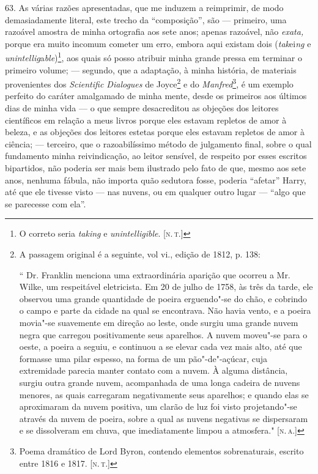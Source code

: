 63. As várias razões apresentadas, que me induzem a reimprimir, de modo
demasiadamente literal, este trecho da ``composição'', são --- primeiro,
uma razoável amostra de minha ortografia aos sete anos; apenas razoável,
não \emph{exata,} porque era muito incomum cometer um erro, embora aqui
existam dois (\emph{tak}ei\emph{ng} e
\emph{unintellig}a\emph{ble})\footnote{O correto seria \emph{taking} e
  \emph{unintelligible}. {[}\textsc{n.\,t.}{]}}, aos quais só posso atribuir
minha grande pressa em terminar o primeiro volume; --- segundo, que a
adaptação, à minha história, de materiais provenientes dos
\emph{Scientific Dialogues} de Joyce\footnote{A passagem original é a
  seguinte, vol vi., edição de 1812, p. 138: %

  `` Dr. Franklin menciona uma extraordinária aparição que ocorreu a Mr.
  Wilke, um respeitável eletricista. Em 20 de julho de 1758, às três da
  tarde, ele observou uma grande quantidade de poeira erguendo"-se do
  chão, e cobrindo o campo e parte da cidade na qual se encontrava. Não
  havia vento, e a poeira movia"-se suavemente em direção ao leste, onde
  surgiu uma grande nuvem negra que carregou positivamente seus
  aparelhos. A nuvem moveu"-se para o oeste, a poeira a seguiu, e
  continuou a se elevar cada vez mais alto, até que formasse uma pilar
  espesso, na forma de um pão"-de"-açúcar, cuja extremidade parecia manter
  contato com a nuvem. À alguma distância, surgiu outra grande nuvem,
  acompanhada de uma longa cadeira de nuvens menores, as quais
  carregaram negativamente seus aparelhos; e quando elas se aproximaram
  da nuvem positiva, um clarão de luz foi visto projetando"-se através da
  nuvem de poeira, sobre a qual as nuvens negativas se dispersaram e se
  dissolveram em chuva, que imediatamente limpou a atmosfera." {[}\textsc{n.\,a.}{]}} e do \emph{Manfred}\footnote{Poema dramático de Lord Byron,
  contendo elementos sobrenaturais, escrito entre 1816 e 1817. {[}\textsc{n.\,t.}{]}}, é um exemplo perfeito do caráter amalgamado de minha mente,
desde os primeiros aos últimos dias de minha vida --- o que sempre
desacreditou as objeções dos leitores científicos em relação a meus
livros porque eles estavam repletos de amor à beleza, e as objeções dos
leitores estetas porque eles estavam repletos de amor à ciência; ---
terceiro, que o razoabilíssimo método de julgamento final, sobre o qual
fundamento minha reivindicação, ao leitor sensível, de respeito por
esses escritos bipartidos, não poderia ser mais bem ilustrado pelo fato
de que, mesmo aos sete anos, nenhuma fábula, não importa quão sedutora
fosse, poderia ``afetar'' Harry, até que ele tivesse visto --- nas
nuvens, ou em qualquer outro lugar --- ``algo que se parecesse com ela''.

